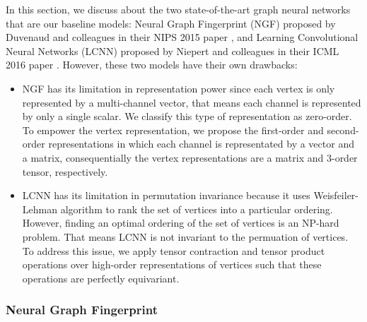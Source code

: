 \documentclass[a4paper]{article}
\begin{document}
In this section, we discuss about the two state-of-the-art graph neural networks that are our baseline models: Neural Graph Fingerprint (NGF) proposed by Duvenaud and colleagues in their NIPS 2015 paper \cite{Duvenaud}, and Learning Convolutional Neural Networks (LCNN) proposed by Niepert and colleagues in their ICML 2016 paper \cite{Niepert}. However, these two models have their own drawbacks:
\begin{itemize}
	\item NGF has its limitation in representation power since each vertex is only represented by a multi-channel vector, that means each channel is represented by only a single scalar. We classify this type of representation as zero-order. To empower the vertex representation, we propose the first-order and second-order representations in which each channel is representated by a vector and a matrix, consequentially the vertex representations are a matrix and 3-order tensor, respectively.
	\item LCNN has its limitation in permutation invariance because it uses Weisfeiler-Lehman algorithm to rank the set of vertices into a particular ordering. However, finding an optimal ordering of the set of vertices is an NP-hard problem. That means LCNN is not invariant to the permuation of vertices. To address this issue, we apply tensor contraction and tensor product operations over high-order representations of vertices such that these operations are perfectly equivariant.
\end{itemize}

\subsubsection{Neural Graph Fingerprint \cite{Duvenaud}}
\end{document}
